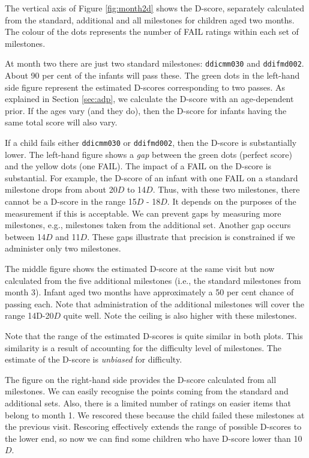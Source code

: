 \documentclass[
]{book}
\begin{document}
The vertical axis of Figure \ref{fig:month2d} shows the D-score, separately calculated from the standard, additional and all milestones for children aged two months. The colour of the dots represents the number of FAIL ratings within each set of milestones.

At month two there are just two standard milestones: \texttt{ddicmm030} and \texttt{ddifmd002}. About 90 per cent of the infants will pass these. The green dots in the left-hand side figure represent the estimated D-scores corresponding to two passes. As explained in Section \ref{sec:adp}, we calculate the D-score with an age-dependent prior. If the ages vary (and they do), then the D-score for infants having the same total score will also vary.

If a child fails either \texttt{ddicmm030} or \texttt{ddifmd002}, then the D-score is substantially lower. The left-hand figure shows a \emph{gap} between the green dots (perfect score) and the yellow dots (one FAIL). The impact of a FAIL on the D-score is substantial. For example, the D-score of an infant with one FAIL on a standard milestone drops from about 20\(D\) to 14\(D\). Thus, with these two milestones, there cannot be a D-score in the range 15\(D\) - 18\(D\). It depends on the purposes of the measurement if this is acceptable. We can prevent gaps by measuring more milestones, e.g., milestones taken from the additional set. Another gap occurs between 14\(D\) and 11\(D\). These gaps illustrate that precision is constrained if we administer only two milestones.

The middle figure shows the estimated D-score at the same visit but now calculated from the five additional milestones (i.e., the standard milestones from month 3). Infant aged two months have approximately a 50 per cent chance of passing each. Note that administration of the additional milestones will cover the range 14D-20\(D\) quite well. Note the ceiling is also higher with these milestones.

Note that the range of the estimated D-scores is quite similar in both plots. This similarity is a result of accounting for the difficulty level of milestones. The estimate of the D-score is \emph{unbiased} for difficulty.

The figure on the right-hand side provides the D-score calculated from all milestones. We can easily recognise the points coming from the standard and additional sets. Also, there is a limited number of ratings on easier items that belong to month 1. We rescored these because the child failed these milestones at the previous visit. Rescoring effectively extends the range of possible D-scores to the lower end, so now we can find some children who have D-score lower than 10\(D\).
\end{document}
